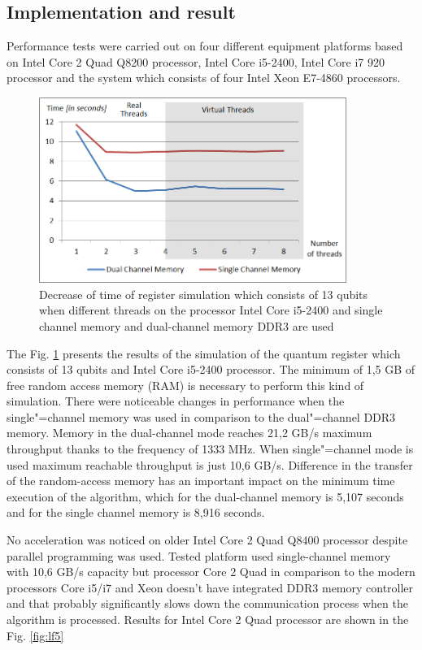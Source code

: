 \documentclass[10pt, a5paper]{article}
\begin{document}
\subsection*{Implementation and result}

Performance tests were carried out on four different equipment platforms based on Intel Core 2 Quad Q8200 processor, Intel Core i5-2400, Intel Core i7 920 processor and the system which consists of four Intel Xeon E7-4860 processors.

\begin{figure}
  \centering
  \includegraphics[width=10cm]{18_2012_2b.png}
  \caption{Decrease of time of register simulation which consists of 13 qubits when different threads on the processor Intel Core i5-2400 and single channel memory and dual-channel memory DDR3 are used}
  \label{fig:lf2}
\end{figure}

The Fig. \ref{fig:lf2} presents the results of the simulation of the quantum register which consists of 13 qubits and Intel Core i5-2400 processor. The minimum of 1,5 GB of free random access memory (RAM) is necessary to perform this kind of simulation. There were noticeable changes in performance when the single"=channel memory was used in comparison to the dual"=channel DDR3 memory. Memory in the dual-channel mode reaches 21,2 GB/s maximum throughput thanks to the frequency of 1333 MHz. When single"=channel mode is used maximum reachable throughput is just 10,6 GB/s. Difference in the transfer of the random-access memory has an important impact on the minimum time execution of the algorithm, which for the dual-channel memory is 5,107 seconds and for the single channel memory is 8,916 seconds.

No acceleration was noticed on older Intel Core 2 Quad Q8400 processor despite  parallel programming was used. Tested platform used single-channel memory with 10,6 GB/s capacity  but processor Core 2 Quad in comparison to the modern processors Core i5/i7 and Xeon doesn't have integrated DDR3 memory controller and that probably significantly slows down the communication process when the algorithm is processed. Results for Intel Core 2 Quad processor are shown in the Fig. \ref{fig:lf5}
\end{document}
